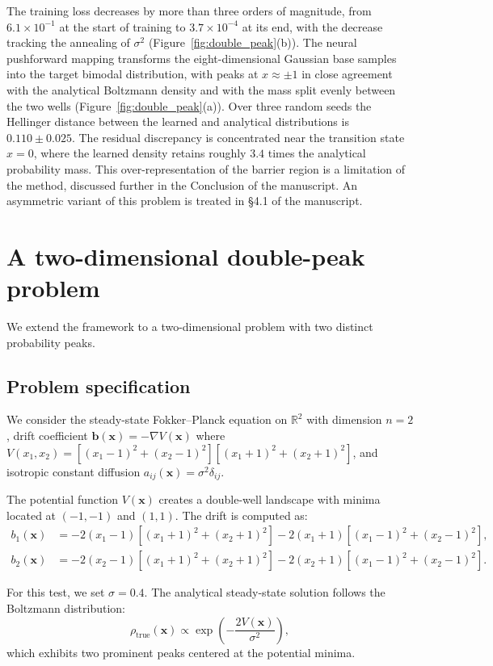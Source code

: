 \documentclass[11pt,a4paper]{article}
\renewcommand{\mathbf}[1]{\boldsymbol{#1}}
\newcommand{\revtwo}[1]{\textcolor{revtwocolor}{#1}}
\newcommand{\revthree}[1]{\textcolor{revthreecolor}{#1}}
\begin{document}
\revthree{The training loss decreases by more than three orders of magnitude, from $6.1 \times 10^{-1}$ at the start of training to $3.7 \times 10^{-4}$ at its end, with the decrease tracking the annealing of $\sigma^2$ (Figure~\ref{fig:double_peak}(b)). The neural pushforward mapping transforms the eight-dimensional Gaussian base samples into the target bimodal distribution, with peaks at $x \approx \pm 1$ in close agreement with the analytical Boltzmann density and with the mass split evenly between the two wells (Figure~\ref{fig:double_peak}(a)). Over three random seeds the Hellinger distance between the learned and analytical distributions is $0.110 \pm 0.025$. The residual discrepancy is concentrated near the transition state $x = 0$, where the learned density retains roughly $3.4$ times the analytical probability mass. This over-representation of the barrier region is a limitation of the method, discussed further in the Conclusion of the manuscript. An asymmetric variant of this problem is treated in \S4.1 of the manuscript.}

\FloatBarrier
\section{A two-dimensional double-peak problem}\label{sup:dp2d}

We extend the framework to a two-dimensional problem with two distinct probability peaks.

\subsection{Problem specification}
We consider the steady-state Fokker--Planck equation on $\mathbb{R}^2$ with dimension $n=2$, drift coefficient $\mathbf{b}(\mathbf{x}) = -\nabla V(\mathbf{x})$ where $V(x_1, x_2) = [(x_1-1)^2 + (x_2-1)^2][(x_1+1)^2 + (x_2+1)^2]$, and isotropic constant diffusion \revtwo{$a_{ij}(\mathbf{x}) = \sigma^2 \delta_{ij}$}.

The potential function $V(\mathbf{x})$ creates a double-well landscape with minima located at $(-1, -1)$ and $(1, 1)$. The drift is computed as:
\begin{align*}
b_1(\mathbf{x}) &= -2(x_1-1)[(x_1+1)^2 + (x_2+1)^2] - 2(x_1+1)[(x_1-1)^2 + (x_2-1)^2], \\
b_2(\mathbf{x}) &= -2(x_2-1)[(x_1+1)^2 + (x_2+1)^2] - 2(x_2+1)[(x_1-1)^2 + (x_2-1)^2].
\end{align*}

For this test, we set $\sigma = 0.4$. The analytical steady-state solution follows the Boltzmann distribution:
\begin{equation} \label{dp2d-rho-true}
\rho_{\text{true}}(\mathbf{x}) \propto \exp\left(-\frac{2V(\mathbf{x})}{\sigma^2}\right),
\end{equation}
which exhibits two prominent peaks centered at the potential minima.
\end{document}
